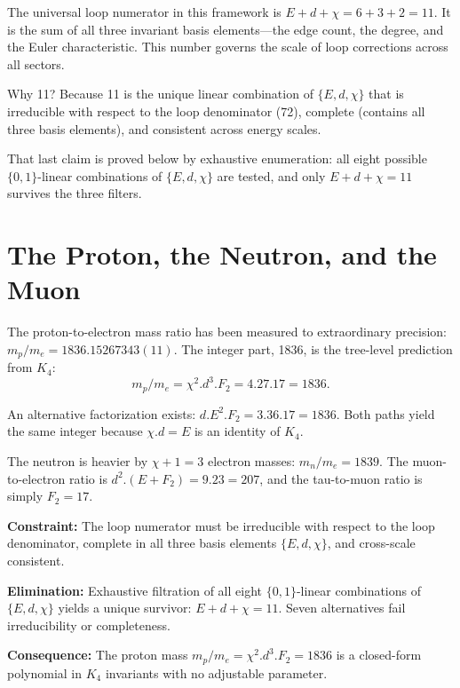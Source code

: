 \documentclass[11pt,a4paper]{book}
\def\cdot{.}%
\newcommand{\VoidRef}[2]{\textit{#2} (in \textit{Void})}
\begin{document}
The universal loop numerator in this framework is $E + d + \chi = 6 + 3 + 2 = 11$. It is the sum of all three invariant basis elements---the edge count, the degree, and the Euler characteristic. This number governs the scale of loop corrections across all sectors.

Why 11? Because 11 is the unique linear combination of $\{E, d, \chi\}$ that is irreducible with respect to the loop denominator (72), complete (contains all three basis elements), and consistent across energy scales.%

That last claim is proved below by exhaustive enumeration: all eight possible $\{0,1\}$-linear combinations of $\{E, d, \chi\}$ are tested, and only $E + d + \chi = 11$ survives the three filters.

\section{The Proton, the Neutron, and the Muon}

The proton-to-electron mass ratio has been measured to extraordinary precision: $m_p/m_e = 1836.15267343(11)$. The integer part, 1836, is the tree-level prediction from $K_4$:
\[
m_p/m_e = \chi^2 \cdot d^3 \cdot F_2 = 4 \cdot 27 \cdot 17 = 1836.
\]

An alternative factorization exists: $d \cdot E^2 \cdot F_2 = 3 \cdot 36 \cdot 17 = 1836$. Both paths yield the same integer because $\chi \cdot d = E$ is an identity of $K_4$.%

The neutron is heavier by $\chi + 1 = 3$ electron masses: $m_n/m_e = 1839$. The muon-to-electron ratio is $d^2 \cdot (E + F_2) = 9 \cdot 23 = 207$, and the tau-to-muon ratio is simply $F_2 = 17$.

\textbf{Constraint:} The loop numerator must be irreducible with respect to the loop denominator, complete in all three basis elements $\{E, d, \chi\}$, and cross-scale consistent.

\textbf{Elimination:} Exhaustive filtration of all eight $\{0,1\}$-linear combinations of $\{E, d, \chi\}$ yields a unique survivor: $E + d + \chi = 11$. Seven alternatives fail irreducibility or completeness.

\textbf{Consequence:} The proton mass $m_p/m_e = \chi^2 \cdot d^3 \cdot F_2 = 1836$ is a closed-form polynomial in $K_4$ invariants with no adjustable parameter.
\end{document}
